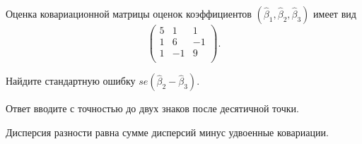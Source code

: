 
\begin{question}
Оценка ковариационной матрицы оценок коэффициентов \((\hat\beta_1, \hat\beta_2, \hat\beta_3)\) имеет вид
\[
\begin{pmatrix}
5 & 1 & 1 \\
1 & 6 & -1 \\
1 & -1 & 9 \\
\end{pmatrix}.
\]

Найдите стандартную ошибку \(se(\hat\beta_2 - \hat\beta_3)\).

Ответ вводите с точностью до двух знаков после десятичной точки.
\end{question}

\begin{solution}
Дисперсия разности равна сумме дисперсий минус удвоенные ковариации.
\end{solution}

